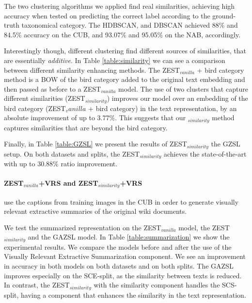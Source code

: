 \documentclass[11pt,a4paper]{article}
\newcommand\reut[1]{\textcolor{green}{\textbf{REUT:} #1 }}
\begin{document}


The two clustering algorithms we applied find real similarities, achieving high accuracy when tested on predicting the correct label according to the ground-truth taxonomical category. The HDBSCAN, and DBSCAN achieved 88\% and 84.5\% accuracy on the CUB, and 93.07\% and 95.05\% on the NAB, accordingly.

Interestingly though, different clustering find different sources of similarities, that are essentially {\em additive}. In Table \ref{table:similarity} we can see a comparison between different similarity enhancing methods. 
The ZEST$_{vanilla}$ + bird category method is a BOW of the bird category added to the original text embedding and then passed as before to a ZEST$_{vanilla}$ model. 
The use of two clusters that capture different similarities (ZEST$_{similarity}$) improves our model over an embedding of the bird category (ZEST$_vanilla$ + bird category) in the text representation, by an absolute improvement of up to 3.77\%. This suggests that our $_{similarity}$ method captures similarities that are beyond the bird category. %

Finally, 
in Table \ref{table:GZSL} we present the results of ZEST$_{similarity}$  the GZSL setup. On both datasets and splits, the ZEST$_{similarity}$ achieves the state-of-the-art with up to 30.88\% ratio improvement.

\paragraph{ ZEST$_{vanilla}$+VRS and ZEST$_{similarity}$+VRS }
use the captions from training images in the CUB in order to generate visually relevant extractive summaries of the original wiki documents.

We test the summarized representation on the ZEST$_{vanilla}$ model, the ZEST$_{similarity}$ and the GAZSL \citep{zhu2018generative} model. In Table \ref{table:summarization} we show the experimental results. We compare the models before and after the use of the Visually Relevant  Extractive Summarization component. We see an improvement in accuracy in both models on both datasets and on both splits. The GAZSL improves especially on the SCE-split, as the similarity between texts is reduced. In contrast, the ZEST$_{similarity}$ with the similarity component handles the SCS-split, having a component that enhances the similarity in the text representation.  
\end{document}
